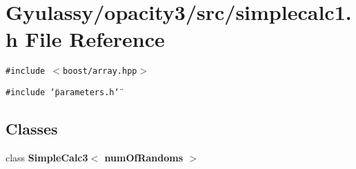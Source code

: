 \section{Gyulassy/opacity3/src/simplecalc1.h File Reference}
\label{simplecalc1_8h}
{\tt \#include $<$boost/array.hpp$>$}\par
{\tt \#include \char`\"{}parameters.h\char`\"{}}\par
\subsection*{Classes}
\begin{CompactItemize}
\item 
class {\bf SimpleCalc3$<$ numOfRandoms $>$}
\end{CompactItemize}
